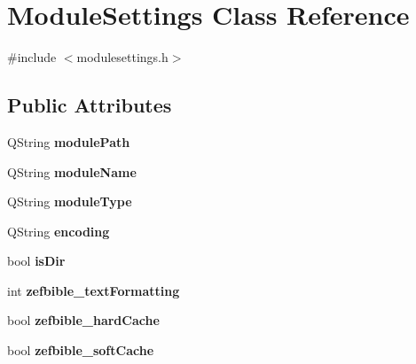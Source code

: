 \hypertarget{classModuleSettings}{
\section{ModuleSettings Class Reference}
\label{classModuleSettings}
}


{\ttfamily \#include $<$modulesettings.h$>$}

\subsection*{Public Attributes}
\begin{DoxyCompactItemize}
\item 
\hypertarget{classModuleSettings_aa408aa93b659f03f91d66e742c56c39c}{
QString {\bfseries modulePath}}
\label{classModuleSettings_aa408aa93b659f03f91d66e742c56c39c}

\item 
\hypertarget{classModuleSettings_acf1a856fdf42a2ceee420d478a272256}{
QString {\bfseries moduleName}}
\label{classModuleSettings_acf1a856fdf42a2ceee420d478a272256}

\item 
\hypertarget{classModuleSettings_aa5aa01e89cd61f4b19134b0d5d372034}{
QString {\bfseries moduleType}}
\label{classModuleSettings_aa5aa01e89cd61f4b19134b0d5d372034}

\item 
\hypertarget{classModuleSettings_a0c0bb115443c382e54e406aa1a0ecce2}{
QString {\bfseries encoding}}
\label{classModuleSettings_a0c0bb115443c382e54e406aa1a0ecce2}

\item 
\hypertarget{classModuleSettings_a8609fa8d6e05485f136ede4b7497d393}{
bool {\bfseries isDir}}
\label{classModuleSettings_a8609fa8d6e05485f136ede4b7497d393}

\item 
\hypertarget{classModuleSettings_ae48c0b3d62cf6e20b6ecf6d2c9df46bb}{
int {\bfseries zefbible\_\-textFormatting}}
\label{classModuleSettings_ae48c0b3d62cf6e20b6ecf6d2c9df46bb}

\item 
\hypertarget{classModuleSettings_a3a2e80afc1f966db21ef5fb326dbdf7f}{
bool {\bfseries zefbible\_\-hardCache}}
\label{classModuleSettings_a3a2e80afc1f966db21ef5fb326dbdf7f}

\item 
\hypertarget{classModuleSettings_a457dcb021bbe45a905fd66e0e92c9435}{
bool {\bfseries zefbible\_\-softCache}}
\label{classModuleSettings_a457dcb021bbe45a905fd66e0e92c9435}


\end{DoxyCompactItemize}
